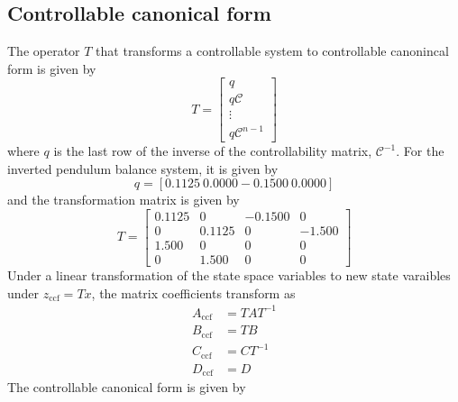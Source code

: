 \documentclass[12pt]{article}
\numberwithin{equation}{section}
\newcommand{\cC}{\mathcal{C}}
\begin{document}
\subsection{Controllable canonical form}
\label{sec:ccf}
The operator $T$ that transforms a controllable system to controllable canonincal form is given by
\begin{equation}
    T
    =
    \begin{bmatrix}
        q\\
        q \cC\\
        \vdots\\
        q \cC^{n-1}
    \end{bmatrix}
\end{equation}
where $q$ is the last row of the inverse of the controllability matrix, $\cC^{-1}$. For the inverted pendulum balance system, it is given by
\begin{equation}
    q = \left[0.1125\ 0.0000 -0.1500\ 0.0000\right]
\end{equation}
and the transformation matrix is given by
\begin{equation}
    T
    =
    \begin{bmatrix}
        0.1125 & 0 & -0.1500 & 0\\
        0 & 0.1125 & 0 & -1.500\\
        1.500 & 0 & 0 & 0\\
        0 & 1.500 & 0 & 0
    \end{bmatrix}
\end{equation}
Under a linear transformation of the state space variables to new state varaibles under $z_\text{ccf} = T x$, the matrix coefficients transform as
\begin{align}
    A_\text{ccf} &= TAT^{-1}\\
    B_\text{ccf} &= TB\\
    C_\text{ccf} &= CT^{-1}\\
    D_\text{ccf} &= D
\end{align}
The controllable canonical form is given by
\end{document}
